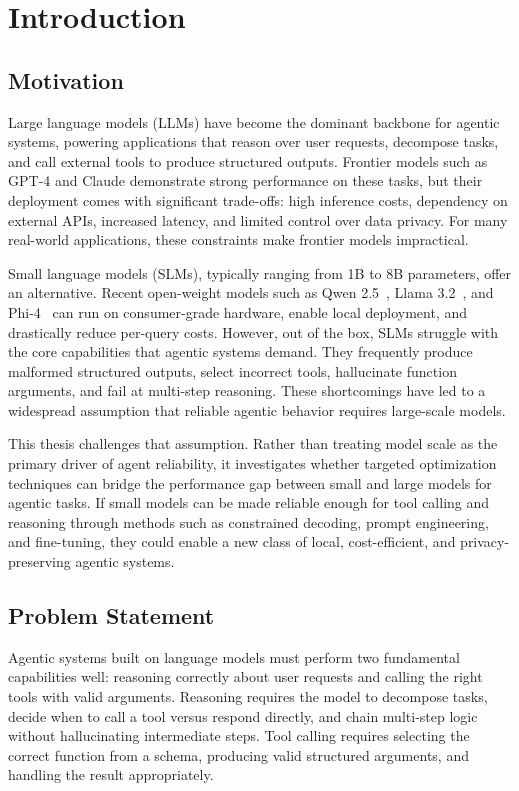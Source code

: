 \chapter{Introduction} \label{ch:introduction}

\section{Motivation}

Large language models (LLMs) have become the dominant backbone for agentic systems, powering applications that reason over user requests, decompose tasks, and call external tools to produce structured outputs. Frontier models such as GPT-4 and Claude demonstrate strong performance on these tasks, but their deployment comes with significant trade-offs: high inference costs, dependency on external APIs, increased latency, and limited control over data privacy. For many real-world applications, these constraints make frontier models impractical.

Small language models (SLMs), typically ranging from 1B to 8B parameters, offer an alternative. Recent open-weight models such as Qwen 2.5~\cite{qwen2024qwen25}, Llama 3.2~\cite{llama2024llama32}, and Phi-4~\cite{abdin2024phi} can run on consumer-grade hardware, enable local deployment, and drastically reduce per-query costs. However, out of the box, SLMs struggle with the core capabilities that agentic systems demand. They frequently produce malformed structured outputs, select incorrect tools, hallucinate function arguments, and fail at multi-step reasoning. These shortcomings have led to a widespread assumption that reliable agentic behavior requires large-scale models.

This thesis challenges that assumption. Rather than treating model scale as the primary driver of agent reliability, it investigates whether targeted optimization techniques can bridge the performance gap between small and large models for agentic tasks. If small models can be made reliable enough for tool calling and reasoning through methods such as constrained decoding, prompt engineering, and fine-tuning, they could enable a new class of local, cost-efficient, and privacy-preserving agentic systems.

\section{Problem Statement}

Agentic systems built on language models must perform two fundamental capabilities well: reasoning correctly about user requests and calling the right tools with valid arguments. Reasoning requires the model to decompose tasks, decide when to call a tool versus respond directly, and chain multi-step logic without hallucinating intermediate steps. Tool calling requires selecting the correct function from a schema, producing valid structured arguments, and handling the result appropriately.


